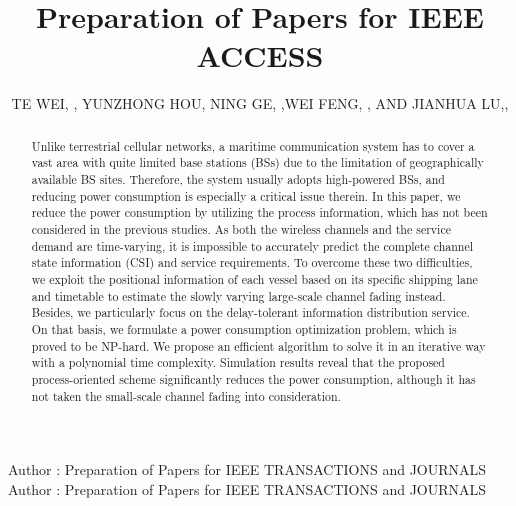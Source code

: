 \documentclass{ieeeaccess}
\begin{document}

\title{Preparation of Papers for IEEE ACCESS}

\author{\uppercase{Te Wei}, ,
\uppercase{Yunzhong Hou}, \uppercase{Ning Ge},
,\uppercase{Wei Feng},
, \uppercase{and Jianhua Lu},,
}
\address[1]{National Institute of Standards and 
Technology, Boulder, CO 80305 USA (e-mail: author@boulder.nist.gov)}
\address[2]{Department of Physics, Colorado State University, Fort Collins, 
CO 80523 USA (e-mail: author@lamar.colostate.edu)}
\address[3]{Electrical Engineering Department, University of Colorado, Boulder, CO 
80309 USA}
\address[4]{Electrical Engineering Department, University of Colorado, Boulder, CO 
80309 USA}
\address[5]{Electrical Engineering Department, University of Colorado, Boulder, CO 
80309 USA}


\markboth
{Author \headeretal: Preparation of Papers for IEEE TRANSACTIONS and JOURNALS}
{Author \headeretal: Preparation of Papers for IEEE TRANSACTIONS and JOURNALS}


\begin{abstract}

Unlike terrestrial cellular networks, a maritime communication system has to cover a vast area with quite limited base stations (BSs) due to the limitation of geographically available BS sites. Therefore, the system usually adopts high-powered BSs, and reducing power consumption is especially a critical issue therein. In this paper, we reduce the power consumption by utilizing the process information, which has not been considered in the previous studies. As both the wireless channels and the service demand are time-varying, it is impossible to accurately predict the complete channel state information (CSI) and service requirements. To overcome these two difficulties, we exploit the positional information of each vessel based on its specific shipping lane and timetable to estimate the slowly varying large-scale channel fading instead. Besides, we particularly focus on the delay-tolerant information distribution service. On that basis, we formulate a power consumption optimization problem, which is proved to be NP-hard. We propose an efficient algorithm to solve it in an iterative way with a polynomial time complexity. Simulation results reveal that the proposed process-oriented scheme significantly reduces the power consumption, although it has not taken the small-scale channel fading into consideration.

\end{abstract}
\end{document}
